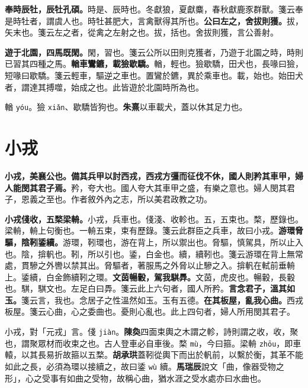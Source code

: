 \textbf{奉時辰牡，辰牡孔碩。}{\footnotesize 時是、辰時也。冬獻狼，夏獻麋，春秋獻鹿豕群獸。箋云奉是時牡者，謂虞人也。時牡甚肥大，言禽獸得其所也。}\textbf{公曰左之，舍拔則獲。}{\footnotesize 拔，矢末也。箋云左之者，從禽之左射之也。拔，括也。舍拔則獲，言公善射。}

\textbf{遊于北園，四馬既閑。}{\footnotesize 閑，習也。箋云公所以田則克獲者，乃遊于北園之時，時則已習其四種之馬。}\textbf{輶車鸞鑣，載獫歇驕。}{\footnotesize 輶，輕也。獫歇驕，田犬也，長喙曰獫，短喙曰歇驕。箋云輕車，驅逆之車也。置鸞於鑣，異於乘車也。載，始也。始田犬者，謂達其搏噬，始成之也。此皆遊於北園時所為也。}

\begin{quoting}輶 \texttt{yóu}。獫 \texttt{xiǎn}、歇驕皆狗也。\textbf{朱熹}以車載犬，蓋以休其足力也。\end{quoting}

\section{小戎}


\textbf{小戎，美襄公也。備其兵甲以討西戎，西戎方彊而征伐不休，國人則矜其車甲，婦人能閔其君子焉。}{\footnotesize 矜，夸大也。國人夸大其車甲之盛，有樂之意也。婦人閔其君子，恩義之至也。作者敘外內之志，所以美君政教之功。}

\textbf{小戎俴收，五楘梁輈。}{\footnotesize 小戎，兵車也。俴淺、收軫也。五，五束也。楘，歷錄也。梁輈，輈上句衡也。一輈五束，束有歷錄。箋云此群臣之兵車，故曰小戎。}\textbf{游環脅驅，陰靷鋈續。}{\footnotesize 游環，靷環也，游在背上，所以禦出也。脅驅，慎駕具，所以止入也。陰，揜軓也。靷，所以引也。鋈，白金也。續，續靷也。箋云游環在背上無常處，貫驂之外轡以禁其出。脅驅者，著服馬之外脅以止驂之入。揜軓在軾前垂輈上。鋈續，白金飾續靷之環。}\textbf{文茵暢轂，駕我騏馵。}{\footnotesize 文茵，虎皮也。暢轂，長轂也。騏，騏文也。左足白曰馵。箋云此上六句者，國人所矜。}\textbf{言念君子，溫其如玉。}{\footnotesize 箋云言，我也。念居子之性溫然如玉。玉有五德。}\textbf{在其板屋，亂我心曲。}{\footnotesize 西戎板屋。箋云心曲，心之委曲也。憂則心亂也。此上四句者，婦人所用閔其君子。}

\begin{quoting}小戎，對「元戎」言。俴 \texttt{jiàn}。\textbf{陳奐}四面束輿之木謂之軫，詩則謂之收，收，聚也，謂聚眾材而收束之也。古人登車必自車後。楘 \texttt{mù}，今曰箍。梁輈 \texttt{zhōu}，即車轅，以其長易折故箍以五楘。\textbf{胡承珙}蓋靷從輿下而出於軓前，以繫於衡，其革不能如此之長，必須為環以接續之，故曰鋈 \texttt{wù} 續。\textbf{馬瑞辰}說文「曲，像器受物之形」，心之受事有如曲之受物，故稱心曲，猶水涯之受水處亦曰水曲也。\end{quoting}

